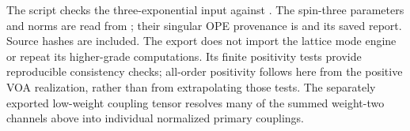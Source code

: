 The script checks the three-exponential input against
.  The spin-three
parameters and norms are read from
; their singular OPE
provenance is
 and its saved
report.  Source hashes are included.  The export does not import the
lattice mode engine or repeat its higher-grade computations.  Its
finite positivity tests provide reproducible consistency checks;
all-order positivity follows here from the positive VOA realization,
rather than from extrapolating those tests.  The separately exported
low-weight coupling tensor resolves many of the summed weight-two
channels above into individual normalized primary couplings.
